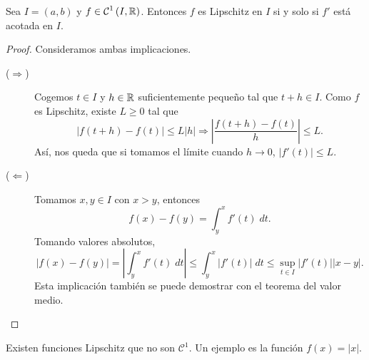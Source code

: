 \begin{prop}
Sea $\displaystyle I = \left(a,b\right) $ y $\displaystyle f \in \mathcal{C}^{1}\left(I, \mathbb{R}\right) $. Entonces $\displaystyle f $ es Lipschitz en $\displaystyle I $ si y solo si $\displaystyle f' $ está acotada en $\displaystyle I $. 
\end{prop}
\begin{proof}
Consideramos ambas implicaciones.
\begin{description}
\item[($\displaystyle \Rightarrow $)] Cogemos $\displaystyle t \in I $ y $\displaystyle h \in \mathbb{R} $ suficientemente pequeño tal que $\displaystyle t + h \in I $. Como $\displaystyle f $ es Lipschitz, existe $\displaystyle L \geq0 $ tal que
	\[ \left|f\left(t + h\right)-f\left(t\right)\right| \leq L \left|h\right| \Rightarrow \left|\frac{f\left(t + h\right)-f\left(t\right)}{h}\right|\leq L.\]
Así, nos queda que si tomamos el límite cuando $\displaystyle h \to 0 $, $\displaystyle \left|f'\left(t\right)\right|\leq L $. 
\item[($\displaystyle \Leftarrow $)] Tomamos $\displaystyle x,y \in I $ con $\displaystyle x > y $, entonces
	\[f\left(x\right)-f\left(y\right)=\int^{x}_{y} f'\left(t\right) \; dt .\]
	Tomando valores absolutos,
	\[ \left|f\left(x\right)-f\left(y\right)\right| = \left|\int^{x}_{y} f'\left(t\right) \; dt\right|\leq \int^{x}_{y} \left|f'\left(t\right)\right| \; dt \leq \sup_{t \in I} \left|f'\left(t\right)\right| \left|x-y\right| .\]
	Esta implicación también se puede demostrar con el teorema del valor medio.
\end{description}
\end{proof}

\begin{observation}
Existen funciones Lipschitz que no son $\displaystyle \mathcal{C}^{1} $. Un ejemplo es la función $\displaystyle f\left(x\right) = \left|x\right| $. 
\end{observation}

